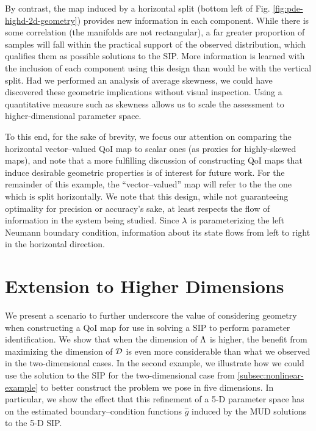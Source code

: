 By contrast, the map induced by a horizontal split (bottom left of Fig. \ref{fig:pde-highd-2d-geometry}) provides new information in each component.
While there is some correlation (the manifolds are not rectangular), a far greater proportion of samples will fall within the practical support of the observed distribution, which qualifies them as possible solutions to the SIP.
More information is learned with the inclusion of each component using this design than would be with the vertical split.
Had we performed an analysis of average skewness, we could have discovered these geometric implications without visual inspection.
Using a quantitative measure such as skewness allows us to scale the assessment to higher-dimensional parameter space.

To this end, for the sake of brevity, we focus our attention on comparing the horizontal vector--valued QoI map to scalar ones (as proxies for highly-skewed maps), and note that a more fulfilling discussion of constructing QoI maps that induce desirable geometric properties is of interest for future work.
For the remainder of this example, the ``vector--valued'' map will refer to the the one which is split horizontally.
We note that this design, while not guaranteeing optimality for precision or accuracy's sake, at least respects the flow of information in the system being studied.
Since $\lambda$ is parameterizing the left Neumann boundary condition, information about its state flows from left to right in the horizontal direction.

\FloatBarrier
\section{Extension to Higher Dimensions}
We present a scenario to further underscore the value of considering geometry when constructing a QoI map for use in solving a SIP to perform parameter identification.
We show that when the dimension of ${\Lambda}$ is higher, the benefit from maximizing the dimension of $\mathcal{D}$ is even more considerable than what we observed in the two-dimensional cases.
In the second example, we illustrate how we could use the solution to the SIP for the two-dimensional case from \ref{subsec:nonlinear-example} to better construct the problem we pose in five dimensions.
In particular, we show the effect that this refinement of a 5-D parameter space has on the estimated boundary--condition functions $\widehat{g}$ induced by the MUD solutions to the 5-D SIP.


